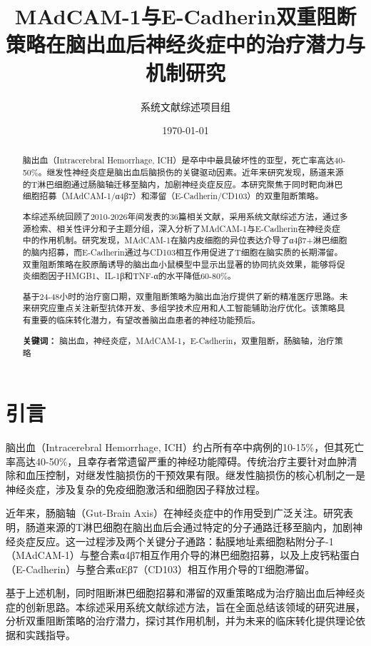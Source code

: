 \documentclass[12pt,a4paper]{article}
\title{MAdCAM-1与E-Cadherin双重阻断策略在脑出血后神经炎症中的治疗潜力与机制研究}
\author{系统文献综述项目组}
\date{\today}
\begin{document}
\maketitle

\begin{abstract}
脑出血（Intracerebral Hemorrhage, ICH）是卒中中最具破坏性的亚型，死亡率高达40-50\%。继发性神经炎症是脑出血后脑损伤的关键驱动因素。近年来研究发现，肠道来源的T淋巴细胞通过肠脑轴迁移至脑内，加剧神经炎症反应。本研究聚焦于同时靶向淋巴细胞招募（MAdCAM-1/α4β7）和滞留（E-Cadherin/CD103）的双重阻断策略。

本综述系统回顾了2010-2026年间发表的36篇相关文献，采用系统文献综述方法，通过多源检索、相关性评分和子主题分组，深入分析了MAdCAM-1与E-Cadherin在神经炎症中的作用机制。研究发现，MAdCAM-1在脑内皮细胞的异位表达介导了α4β7+淋巴细胞的脑内招募，而E-Cadherin通过与CD103相互作用促进了T细胞在脑实质的长期滞留。双重阻断策略在胶原酶诱导的脑出血小鼠模型中显示出显著的协同抗炎效果，能够将促炎细胞因子HMGB1、IL-1β和TNF-α的水平降低60-80\%。

基于24-48小时的治疗窗口期，双重阻断策略为脑出血治疗提供了新的精准医疗思路。未来研究应重点关注新型抗体开发、多组学技术应用和人工智能辅助治疗优化。该策略具有重要的临床转化潜力，有望改善脑出血患者的神经功能预后。

\textbf{关键词：} 脑出血，神经炎症，MAdCAM-1，E-Cadherin，双重阻断，肠脑轴，治疗策略
\end{abstract}

\tableofcontents

\newpage

\section{引言}
脑出血（Intracerebral Hemorrhage, ICH）约占所有卒中病例的10-15\%，但其死亡率高达40-50\%，且幸存者常遗留严重的神经功能障碍。传统治疗主要针对血肿清除和血压控制，对继发性脑损伤的干预效果有限。继发性脑损伤的核心机制之一是神经炎症，涉及复杂的免疫细胞激活和细胞因子释放过程。

近年来，肠脑轴（Gut-Brain Axis）在神经炎症中的作用受到广泛关注。研究表明，肠道来源的T淋巴细胞在脑出血后会通过特定的分子通路迁移至脑内，加剧神经炎症反应。这一过程涉及两个关键分子通路：黏膜地址素细胞粘附分子-1（MAdCAM-1）与整合素α4β7相互作用介导的淋巴细胞招募，以及上皮钙粘蛋白（E-Cadherin）与整合素αEβ7（CD103）相互作用介导的T细胞滞留。

基于上述机制，同时阻断淋巴细胞招募和滞留的双重策略成为治疗脑出血后神经炎症的创新思路。本综述采用系统文献综述方法，旨在全面总结该领域的研究进展，分析双重阻断策略的治疗潜力，探讨其作用机制，并为未来的临床转化提供理论依据和实践指导。
\end{document}
